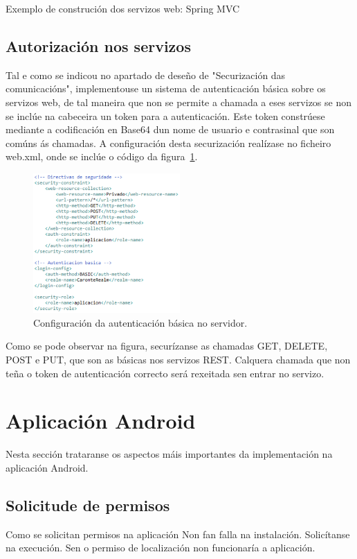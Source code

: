 Exemplo de construción dos servizos web: Spring MVC




\subsection{Autorización nos servizos}
Tal e como se indicou no apartado de deseño de "Securización das comunicacións", implementouse un sistema de autenticación básica sobre os servizos web, de tal maneira que non se permite a chamada a eses servizos se non se inclúe na cabeceira un token para a autenticación. Este token constrúese mediante a codificación en Base64 dun nome de usuario e contrasinal que son comúns ás chamadas. A configuración desta securización realízase no ficheiro web.xml, onde se inclúe o código da figura~\ref{fig:configuracionAutenticacion}.

\begin{figure}[htb] 
	\begin{center}
		\includegraphics[width=0.5\textwidth]{figures/codigo/configuracionAutenticacion}
		\caption{Configuración da autenticación básica no servidor.}
		\label{fig:configuracionAutenticacion}
	\end{center}
\end{figure}

Como se pode observar na figura, securízanse as chamadas GET, DELETE, POST e PUT, que son as básicas nos servizos REST. Calquera chamada que non teña o token de autenticación correcto será rexeitada sen entrar no servizo.


\section{Aplicación Android}
Nesta sección trataranse os aspectos máis importantes da implementación na aplicación Android.
\subsection{Solicitude de permisos}
Como se solicitan permisos na aplicación
Non fan falla na instalación. Solicítanse na execución. Sen o permiso de localización non funcionaría a aplicación.

